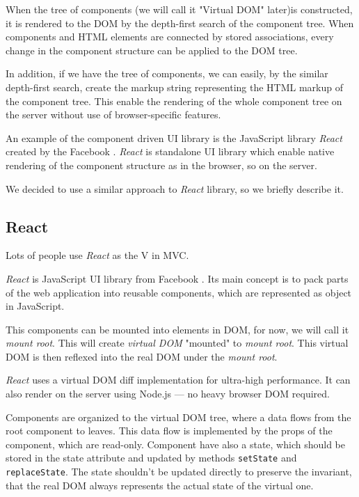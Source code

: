 \documentclass[oneside, 12pt]{book}
\newcommand{\react}[0]{\textit{React} }
\newcommand{\facebook}[0]{Facebook }
\begin{document}
  When the tree of components (we will call it "Virtual DOM" later)is constructed, 
  it is rendered to the DOM by the depth-first search of the component tree.
  When components and HTML elements are connected by stored associations, 
  every change in the component structure can be applied to the DOM tree. 

  In addition, if we have the tree of components, we can easily, by the similar depth-first search, 
  create the markup string representing the HTML markup of the component tree.
  This enable the rendering of the whole component tree on the server without use of browser-specific features.

  An example of the component driven UI library is the JavaScript library \react created by the \facebook.
  \react is standalone UI library which enable native rendering of the component structure as in the browser, so on the server.

  We decided to use a similar approach to \react library, so we briefly describe it.

  \subsection{React}\label{subsec:existing-component-react}
    
    Lots of people use \react as the V in MVC.\cite{react}

    \react is JavaScript UI library from \facebook. 
    Its main concept is to pack parts of the web application into reusable components, 
    which are represented as object in JavaScript. 

    This components can be mounted into elements in DOM, for now, we will call it \textit{mount root}. 
    This will create \textit{virtual DOM} "mounted" to \textit{mount root}. 
    This virtual DOM is then reflexed into the real DOM under the \textit{mount root}.

    \react uses a virtual DOM diff implementation for ultra-high performance. 
    It can also render on the server using Node.js — no heavy browser DOM required.\cite{react}

    Components are organized to the virtual DOM tree, where a data flows from the root component to leaves. 
    This data flow is implemented by the props of the component, which are read-only.
    Component have also a state, which should be stored in the state attribute and updated by methods \texttt{setState} and \texttt{replaceState}. 
    The state shouldn't be updated directly to preserve the invariant, that the real DOM always represents the actual state of the virtual one. 
\end{document}

